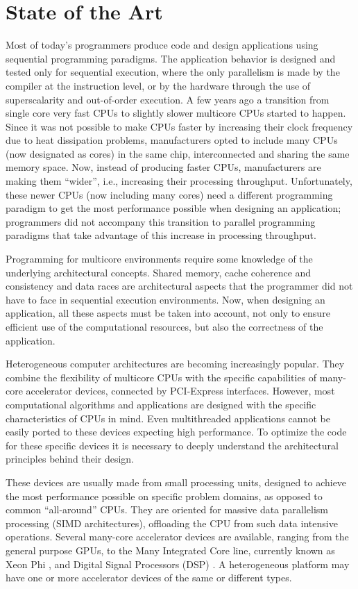 
\chapter{State of the Art}
\label{stateart}

Most of today’s programmers produce code and design applications using sequential programming paradigms. The application behavior is designed and tested only for sequential execution, where the only parallelism is made by the compiler at the instruction level, or by the hardware through the use of superscalarity and out-of-order execution. A few years ago a transition from single core very fast CPUs to slightly slower multicore CPUs started to happen. Since it was not possible to make CPUs faster by increasing their clock frequency due to heat dissipation problems, manufacturers opted to include many CPUs (now designated as cores) in the same chip, interconnected and sharing the same memory space. Now, instead of producing faster CPUs, manufacturers are making them ``wider'', i.e., increasing their processing throughput. Unfortunately, these newer CPUs (now including many cores) need a different programming paradigm to get the most performance possible when designing an application; programmers did not accompany this transition to parallel programming paradigms that take advantage of this increase in processing throughput.

Programming for multicore environments require some knowledge of the underlying architectural concepts. Shared memory, cache coherence and consistency and data races are architectural aspects that the programmer did not have to face in sequential execution environments. Now, when designing an application, all these aspects must be taken into account, not only to ensure efficient use of the computational resources, but also the correctness of the application.

Heterogeneous computer architectures are becoming increasingly popular. They combine the flexibility of multicore CPUs with the specific capabilities of many-core accelerator devices, connected by PCI-Express interfaces. However, most computational algorithms and applications are designed with the specific characteristics of CPUs in mind. Even multithreaded applications cannot be easily ported to these devices expecting high performance. To optimize the code for these specific devices it is necessary to deeply understand the architectural principles behind their design.

These devices are usually made from small processing units, designed to achieve the most performance possible on specific problem domains, as opposed to common ``all-around'' CPUs. They are oriented for massive data parallelism processing (SIMD architectures), offloading the CPU from such data intensive operations. Several many-core accelerator devices are available, ranging from the general purpose GPUs, to the \intel Many Integrated Core line, currently known as \intel Xeon Phi \cite{Intel:MIC}, and Digital Signal Processors (DSP) \cite{Texas:DSP}. A heterogeneous platform may have one or more accelerator devices of the same or different types.


